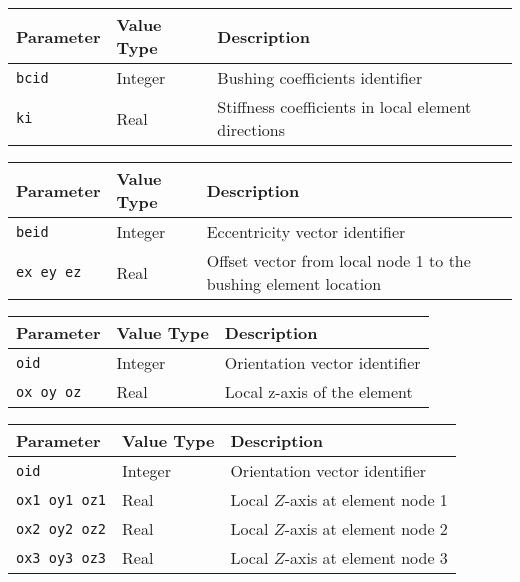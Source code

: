 
\noindent
\begin{tabular}{| m{} | m{} | m{} |}
  \hline
  \rowcolor[HTML]{EFEFEF}
  Parameter  & Value Type & Description \\
  \hline\hline
  {\tt bcid} & Integer & Bushing coefficients identifier \\
  \hline
  {\tt ki} & Real & Stiffness coefficients in local element directions \\
  \hline
\end{tabular}


\noindent
\begin{tabular}{| m{} | m{} | m{} |}
  \hline
  \rowcolor[HTML]{EFEFEF}
  Parameter & Value Type & Description  \\
  \hline\hline
  {\tt beid} & Integer & Eccentricity vector identifier \\
  \hline
  {\tt ex ey ez} & Real & Offset vector from local node 1 to the
                          bushing element location \\
  \hline
\end{tabular}

\clearpage

\noindent
\begin{tabular}{| m{} | m{} | m{} |}
  \hline
  \rowcolor[HTML]{EFEFEF}
  Parameter & Value Type & Description \\
  \hline\hline
  {\tt oid} & Integer & Orientation vector identifier \\
  \hline
  {\tt ox oy oz} & Real & Local z-axis of the element \\
  \hline
\end{tabular}


\noindent
\begin{tabular}{| m{} | m{} | m{} |}
  \hline
  \rowcolor[HTML]{EFEFEF}
  Parameter & Value Type & Description \\
  \hline\hline
  {\tt oid} & Integer & Orientation vector identifier \\
  \hline
  {\tt ox1 oy1 oz1} & Real & Local $Z$-axis at element node 1 \\
  \hline
  {\tt ox2 oy2 oz2} & Real & Local $Z$-axis at element node 2 \\
  \hline
  {\tt ox3 oy3 oz3} & Real & Local $Z$-axis at element node 3 \\
  \hline
\end{tabular}


